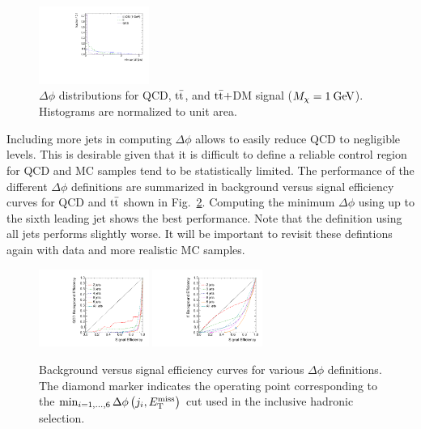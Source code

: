 \begin{figure}[htbp]
  \includegraphics[width=0.32\textwidth]{figures/hadronic-overlay-dphijetmet.pdf}
  \caption{$\Delta\phi$ distributions for QCD, $\mathrm{t}\bar{\mathrm{t}}$, and $\mathrm{t}\bar{\mathrm{t}}+$DM signal ($M_\chi = 1\:\mathrm{Ge\kern -0.1em V}$). Histograms are normalized to unit area.}
  \label{fig:hadronic_overlay_dphijetmet}
\end{figure}

Including more jets in computing $\Delta\phi$ allows to easily reduce QCD to negligible levels. This is desirable given that it is difficult to define a reliable control region for QCD and MC samples tend to be statistically limited. The performance of the different $\Delta\phi$ definitions are summarized in background versus signal efficiency curves for QCD and $\mathrm{t}\bar{\mathrm{t}}$ shown in Fig.~\ref{fig:hadronic_dphijetmet_roc}. Computing the minimum $\Delta\phi$ using up to the sixth leading jet shows the best performance. Note that the definition using all jets performs slightly worse. It will be important to revisit these defintions again with data and more realistic MC samples.

\begin{figure}[htbp]
  \centering
  \includegraphics[width=0.32\textwidth]{figures/ttdm1_vs_qcd-hadronic-roc.pdf}
  \includegraphics[width=0.32\textwidth]{figures/ttdm1_vs_ttbar-hadronic-roc.pdf}
  \caption{Background versus signal efficiency curves for various $\Delta\phi$ definitions. The diamond marker indicates the operating point corresponding to the $\min_{i=1,\ldots,6}\Delta\phi\left(j_i,E_\mathrm{T}^{\mathrm{miss}}\right)$ cut used in the inclusive hadronic selection.}
  \label{fig:hadronic_dphijetmet_roc}
\end{figure}


